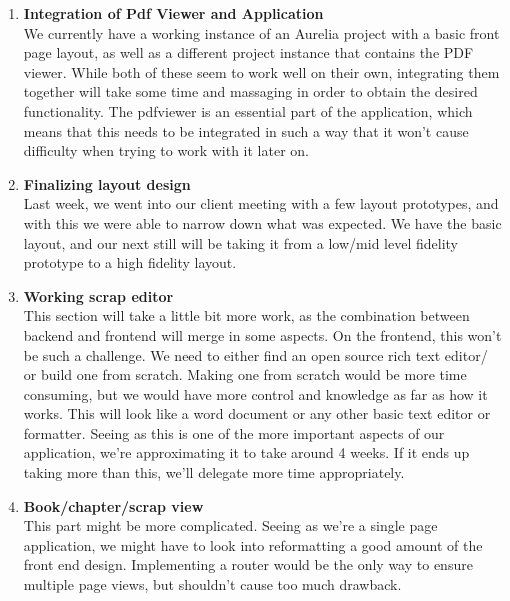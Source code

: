 \documentclass[onecolumn, draftclsnofoot,10pt, compsoc]{IEEEtran}
\begin{document}
\begin{enumerate}
    \item
    \textbf{Integration of Pdf Viewer and Application} \\
	We currently have a working instance of an Aurelia project with a basic front page layout,
	as well as a different project instance that contains the PDF viewer. While both of these
	seem to work well on their own, integrating them together will take some time and massaging
	in order to obtain the desired functionality. The pdfviewer is an essential part of the
	application, which means that this needs to be integrated in such a way that it won't cause
	difficulty when trying to work with it later on. \\

    \item
    \textbf{Finalizing layout design} \\

	Last week, we went into our client meeting with a few layout prototypes, and with this we
	were able to narrow down what was expected. We have the basic layout, and our next still
	will be taking it from a low/mid level fidelity prototype to a high fidelity layout. \\

	\item
	\textbf{Working scrap editor} \\

	This section will take a little bit more work, as the combination between backend and
	frontend will merge in some aspects. On the frontend, this won't be such a challenge.
	We need to either find an open source rich text editor/ or build one from scratch.
	Making one from scratch would be more time consuming, but we would have more control
	and knowledge as far as how it works. This will look like a word document or any other
	basic text editor or formatter. Seeing as this is one of the more important aspects of
	our application, we’re approximating it to take around 4 weeks. If it ends up taking more
	than this, we’ll delegate more time appropriately. \\

	\item
	\textbf{Book/chapter/scrap view} \\

	This part might be more complicated. Seeing as we're a single page application, we might
	have to look into reformatting a good amount of the front end design. Implementing a router
	would be the only way to ensure multiple page views, but shouldn't cause too much drawback. \\


\end{enumerate}
\end{document}
